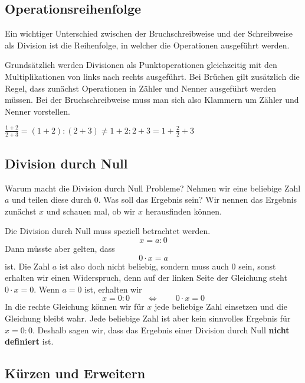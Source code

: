 \subsection{Operationsreihenfolge}

Ein wichtiger Unterschied zwischen der Bruchschreibweise und der Schreibweise als Division ist die Reihenfolge, in welcher die Operationen ausgeführt werden.

Grundsätzlich werden Divisionen als Punktoperationen gleichzeitig mit den Multiplikationen von links nach rechts ausgeführt. Bei Brüchen gilt zusätzlich die Regel, dass zunächst Operationen in Zähler und Nenner ausgeführt werden müssen. Bei der Bruchschreibweise muss man sich also Klammern um Zähler und Nenner vorstellen.
\begin{example}
  $\displaystyle \frac{1+2}{2+3} = (1+2):(2+3) \ne 1+2:2+3 = 1+\frac{2}{2}+3$
\end{example}

\subsection{Division durch Null}

Warum macht die Division durch Null Probleme? Nehmen wir eine beliebige Zahl $a$ und teilen diese durch $0$. Was soll das Ergebnis sein? Wir nennen das Ergebnis zunächst $x$ und schauen mal, ob wir $x$ herausfinden können.

Die Division durch Null muss speziell betrachtet werden.
\[
  x = a:0
\]
Dann müsste aber gelten, dass
\[
  0\cdot x = a
\]
ist. Die Zahl $a$ ist also doch nicht beliebig, sondern muss auch $0$ sein, sonst erhalten wir einen Widerspruch, denn auf der linken Seite der Gleichung steht $0\cdot x = 0$. Wenn $a = 0$ ist, erhalten wir
\[
  x = 0:0 \qquad\Leftrightarrow\qquad 0\cdot x = 0
\]
In die rechte Gleichung können wir für $x$ jede beliebige Zahl einsetzen und die Gleichung bleibt wahr. Jede beliebige Zahl ist aber kein sinnvolles Ergebnis für $x = 0 : 0$. Deshalb sagen wir, dass das Ergebnis einer Division durch Null \textbf{nicht definiert} ist.


\subsection{Kürzen und Erweitern}

